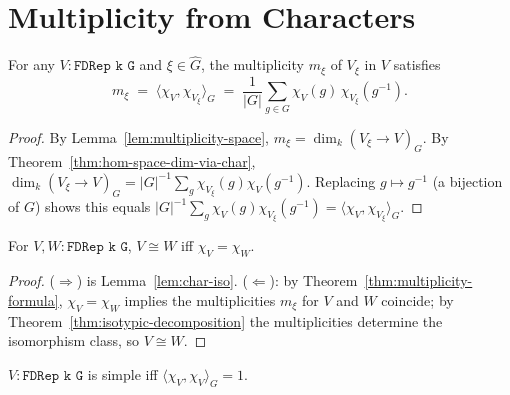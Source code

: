 \section{Multiplicity from Characters}

\begin{theorem}
  \label{thm:multiplicity-formula}
  For any $V : \texttt{FDRep k G}$ and $\xi \in \hat G$, the multiplicity
  $m_\xi$ of $V_\xi$ in $V$ satisfies
  \[
    m_\xi \;=\; \langle \chi_V, \chi_{V_\xi}\rangle_G
    \;=\; \frac{1}{|G|}\sum_{g \in G}\chi_V(g)\,\chi_{V_\xi}(g^{-1}).
  \]
\end{theorem}

\begin{proof}
  By Lemma~\ref{lem:multiplicity-space}, $m_\xi = \dim_k(V_\xi \to V)_G$.
  By Theorem~\ref{thm:hom-space-dim-via-char},
  $\dim_k(V_\xi \to V)_G = |G|^{-1}\sum_g \chi_{V_\xi}(g)\chi_V(g^{-1})$.
  Replacing $g \mapsto g^{-1}$ (a bijection of $G$) shows this equals
  $|G|^{-1}\sum_g \chi_V(g)\chi_{V_\xi}(g^{-1}) = \langle\chi_V,\chi_{V_\xi}\rangle_G$.
\end{proof}

\begin{corollary}
  \label{cor:char-separates}
  For $V, W : \texttt{FDRep k G}$, $V \cong W$ iff $\chi_V = \chi_W$.
\end{corollary}

\begin{proof}
  ($\Rightarrow$) is Lemma~\ref{lem:char-iso}. ($\Leftarrow$):
  by Theorem~\ref{thm:multiplicity-formula}, $\chi_V = \chi_W$ implies the
  multiplicities $m_\xi$ for $V$ and $W$ coincide; by
  Theorem~\ref{thm:isotypic-decomposition} the multiplicities determine the
  isomorphism class, so $V \cong W$.
\end{proof}

\begin{corollary}
  \label{cor:irred-test}
  $V : \texttt{FDRep k G}$ is simple iff $\langle \chi_V, \chi_V\rangle_G = 1$.
\end{corollary}

